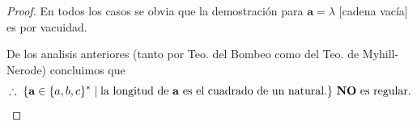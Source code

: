 \documentclass{article}
\begin{document}
\begin{enumerate}
\begin{proof}
    En todos los casos se obvia que la demostración para $\mathbf{a} = \lambda$ [cadena vacía] es por vacuidad.
    
    De los analisis anteriores (tanto por Teo. del Bombeo como del Teo. de Myhill-Nerode) concluimos que
    \[
    \therefore\; \{\mathbf{a} \in \{a, b, c\}^{*}\; |\; \text{la longitud de $\mathbf{a}$
      es el cuadrado de un natural.}\} \text{ \textbf{NO} es regular}.
      \]
  \end{proof}
\end{enumerate}
\end{document}
